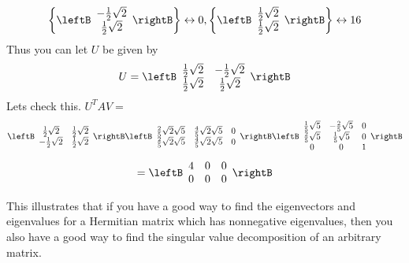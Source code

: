 \begin{equation*}
\left\{ \leftB 
\begin{array}{c}
-\frac{1}{2}\sqrt{2} \\ 
\frac{1}{2}\sqrt{2}
\end{array}
\rightB \right\} \leftrightarrow 0,\left\{ \leftB 
\begin{array}{c}
\frac{1}{2}\sqrt{2} \\ 
\frac{1}{2}\sqrt{2}
\end{array}
\rightB \right\} \leftrightarrow 16
\end{equation*}
Thus you can let $U$ be given by 
\begin{equation*}
U=\leftB 
\begin{array}{cc}
\frac{1}{2}\sqrt{2} & -\frac{1}{2}\sqrt{2} \\ 
\frac{1}{2}\sqrt{2} & \frac{1}{2}\sqrt{2}
\end{array}
\rightB
\end{equation*}
Lets check this. $U^TAV=$ 
\begin{equation*}
\leftB 
\begin{array}{cc}
\frac{1}{2}\sqrt{2} & \frac{1}{2}\sqrt{2} \\ 
-\frac{1}{2}\sqrt{2} & \frac{1}{2}\sqrt{2}
\end{array}
\rightB \leftB  
\begin{array}{ccc}
\frac{2}{5}\sqrt{2}\sqrt{5} & \frac{4}{5}\sqrt{2}\sqrt{5} & 0 \\ 
\frac{2}{5}\sqrt{2}\sqrt{5} & \frac{4}{5}\sqrt{2}\sqrt{5} & 0
\end{array}
\rightB \leftB 
\begin{array}{ccc}
\frac{1}{5}\sqrt{5} & -\frac{2}{5}\sqrt{5} & 0 \\ 
\frac{2}{5}\sqrt{5} & \frac{1}{5}\sqrt{5} & 0 \\ 
0 & 0 & 1
\end{array}
\rightB
\end{equation*}
\begin{equation*}
=\leftB 
\begin{array}{ccc}
4 & 0 & 0 \\ 
0 & 0 & 0
\end{array}
\rightB
\end{equation*}

This illustrates that if you have a good way to find the eigenvectors and
eigenvalues for a Hermitian matrix which has nonnegative eigenvalues, then
you also have a good way to find the singular value decomposition of an
arbitrary matrix.
